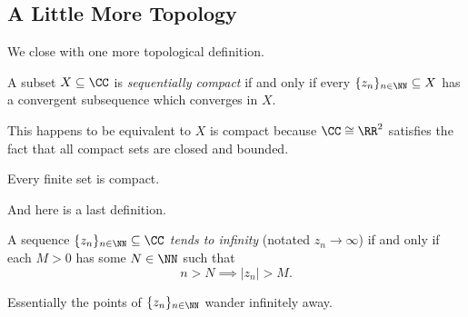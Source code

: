 \subsection{A Little More Topology}
We close with one more topological definition.
\begin{definition}
	A subset $X\subseteq\CC$ is \textit{sequentially compact} if and only if every $\{z_n\}_{n\in\NN}\subseteq X$ has a convergent subsequence which converges in $X$.
\end{definition}
\begin{remark}
	This happens to be equivalent to $X$ is compact because $\CC\cong\RR^2$ satisfies the fact that all compact sets are closed and bounded.
\end{remark}
\begin{example}
	Every finite set is compact.
\end{example}
And here is a last definition.
\begin{definition}
	A sequence $\{z_n\}_{n\in\NN}\subseteq\CC$ \textit{tends to infinity} (notated $z_n\to\infty$) if and only if each $M>0$ has some $N\in\NN$ such that
	\[n>N\implies|z_n|>M.\]
\end{definition}
Essentially the points of $\{z_n\}_{n\in\NN}$ wander infinitely away.